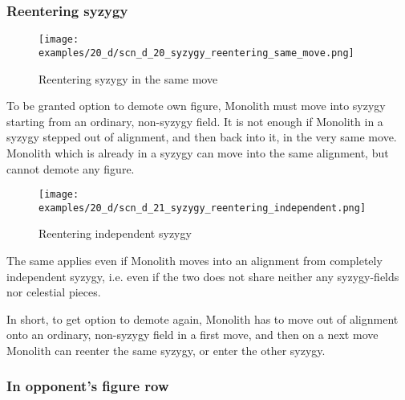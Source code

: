 \subsubsection*{Reentering syzygy}

\vspace*{-1.2\baselineskip}
\noindent
\begin{figure}[!h]
\texttt{[image: examples/20\_d/scn\_d\_20\_syzygy\_reentering\_same\_move.png]}
\caption{Reentering syzygy in the same move}
\label{fig:scn_d_20_syzygy_reentering_same_move}
\end{figure}

To be granted option to demote own figure, Monolith must move into syzygy starting from an ordinary, non-syzygy field.
It is not enough if Monolith in a syzygy stepped out of alignment, and then back into it, in the very same move. Monolith
which is already in a syzygy can move into the same alignment, but cannot demote any figure.

\clearpage %

\noindent
\begin{figure}[!h]
\texttt{[image: examples/20\_d/scn\_d\_21\_syzygy\_reentering\_independent.png]}
\caption{Reentering independent syzygy}
\label{fig:scn_d_21_syzygy_reentering_independent}
\end{figure}

The same applies even if Monolith moves into an alignment from completely independent syzygy, i.e. even if the two does
not share neither any syzygy-fields nor celestial pieces.

In short, to get option to demote again, Monolith has to move out of alignment onto an ordinary, non-syzygy field in a
first move, and then on a next move Monolith can reenter the same syzygy, or enter the other syzygy.

\clearpage %

\subsubsection*{In opponent's figure row}

